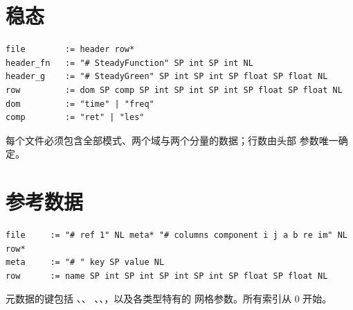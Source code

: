 \section{稳态}
\begin{lstlisting}[numbers=none,language=plaintext]
file        := header row*
header_fn   := "# SteadyFunction" SP int SP int NL
header_g    := "# SteadyGreen" SP int SP int SP float SP float NL
row         := dom SP comp SP int SP int SP int SP float SP float NL
dom         := "time" | "freq"
comp        := "ret" | "les"
\end{lstlisting}
每个文件必须包含全部模式、两个域与两个分量的数据；行数由头部
参数唯一确定。

\section{参考数据}
\begin{lstlisting}[numbers=none,language=plaintext]
file     := "# ref 1" NL meta* "# columns component i j a b re im" NL row*
meta     := "# " key SP value NL
row      := name SP int SP int SP int SP int SP float SP float NL
\end{lstlisting}
元数据的键包括 、、
、、，以及各类型特有的
网格参数。所有索引从 $0$ 开始。
